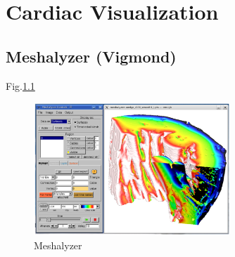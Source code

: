 \chapter{Cardiac Visualization}

\section{Meshalyzer (Vigmond)}

Fig.\ref{fig:meshalyzer}


\begin{figure}[hbt]
  \centerline{\includegraphics[height=5cm,
    angle=0]{./images/meshalyzer.eps}}
  \caption{Meshalyzer}
  \label{fig:meshalyzer}
\end{figure}
